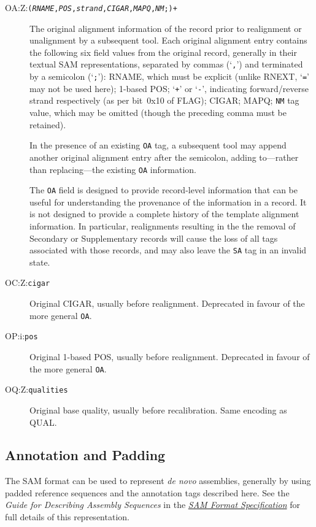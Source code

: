 \documentclass[10pt]{article}
\newcommand{\tagvalue}[1]{{\tt #1}}
\newcommand{\tagregex}[1]{{\tt #1}}
\newcommand{\metavar}[1]{{\rm\emph{#1}}}
\begin{document}
\begin{description}
\item[OA:Z:\tagregex{(\metavar{RNAME},\metavar{POS},\metavar{strand},\metavar{CIGAR},\metavar{MAPQ},\metavar{NM};)+}]
The original alignment information of the record prior to realignment or unalignment by a subsequent tool.
Each original alignment entry contains the following six field values from the original record, generally in their textual SAM representations, separated by commas (`{\tt ,}') and terminated by a semicolon (`{\tt ;}'):
{\sf RNAME}, which must be explicit (unlike {\sf RNEXT}, `{\tt =}' may not be used here);
1-based {\sf POS};
`{\tt +}' or `{\tt -}', indicating forward/reverse strand respectively (as per bit~0x10 of {\sf FLAG});
{\sf CIGAR};
{\sf MAPQ};
{\tt NM} tag value, which may be omitted (though the preceding comma must be retained).

In the presence of an existing {\tt OA} tag, a subsequent tool may append another original alignment entry after the semicolon,
adding to---rather than replacing---the existing {\tt OA} information.

The {\tt OA} field is designed to provide record-level information that can be useful for understanding the provenance of the information in a record.
It is not designed to provide a complete history of the template alignment information.
In particular, realignments resulting in the the removal of Secondary or Supplementary records will cause the loss of all tags associated with those records, and may also leave the {\tt SA} tag in an invalid state.

\item[OC:Z:\tagvalue{cigar}]
Original CIGAR, usually before realignment.
Deprecated in favour of the more general {\tt OA}.

\item[OP:i:\tagvalue{pos}]
Original 1-based {\sf POS}, usually before realignment.
Deprecated in favour of the more general {\tt OA}.

\item[OQ:Z:\tagvalue{qualities}]
Original base quality, usually before recalibration.
Same encoding as {\sf QUAL}.
\end{description}

\subsection{Annotation and Padding}

The SAM format can be used to represent \emph{de novo} assemblies, generally by using padded reference sequences and the annotation tags described here.
See the \emph{Guide for Describing Assembly Sequences} in the \href{http://samtools.github.io/hts-specs/SAMv1.pdf}{\emph{SAM Format Specification}} for full details of this representation.
\end{document}
